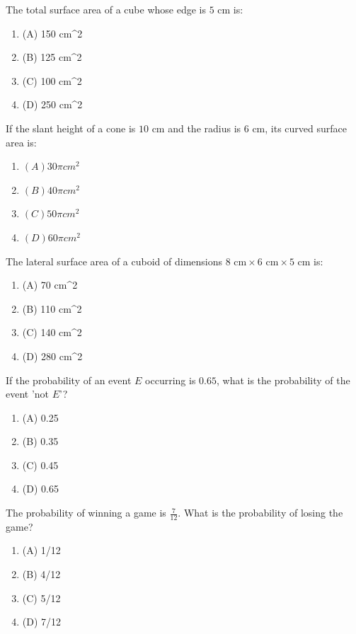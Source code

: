 \documentclass[12pt,a4paper]{exam}
\begin{document}
\begin{questions}
\question[1] The total surface area of a cube whose edge is $5 \text{ cm}$ is:
\begin{enumerate}[label=(\Alph*)]
  \item (A) 150 cm\textasciicircum{}2
  \item (B) 125 cm\textasciicircum{}2
  \item (C) 100 cm\textasciicircum{}2
  \item (D) 250 cm\textasciicircum{}2
\end{enumerate}
\vspace{0.15cm}

\question[1] If the slant height of a cone is $10 \text{ cm}$ and the radius is $6 \text{ cm}$, its curved surface area is:
\begin{enumerate}[label=(\Alph*)]
  \item $(A) 30\pi cm^2$
  \item $(B) 40\pi cm^2$
  \item $(C) 50\pi cm^2$
  \item $(D) 60\pi cm^2$
\end{enumerate}
\vspace{0.15cm}

\question[1] The lateral surface area of a cuboid of dimensions $8 \text{ cm} \times 6 \text{ cm} \times 5 \text{ cm}$ is:
\begin{enumerate}[label=(\Alph*)]
  \item (A) 70 cm\textasciicircum{}2
  \item (B) 110 cm\textasciicircum{}2
  \item (C) 140 cm\textasciicircum{}2
  \item (D) 280 cm\textasciicircum{}2
\end{enumerate}
\vspace{0.15cm}

\question[1] If the probability of an event $E$ occurring is $0.65$, what is the probability of the event 'not $E$'?
\begin{enumerate}[label=(\Alph*)]
  \item (A) 0.25
  \item (B) 0.35
  \item (C) 0.45
  \item (D) 0.65
\end{enumerate}
\vspace{0.15cm}

\question[1] The probability of winning a game is $\frac{7}{12}$. What is the probability of losing the game?
\begin{enumerate}[label=(\Alph*)]
  \item (A) 1/12
  \item (B) 4/12
  \item (C) 5/12
  \item (D) 7/12
\end{enumerate}
\vspace{0.15cm}


\end{questions}
\end{document}
